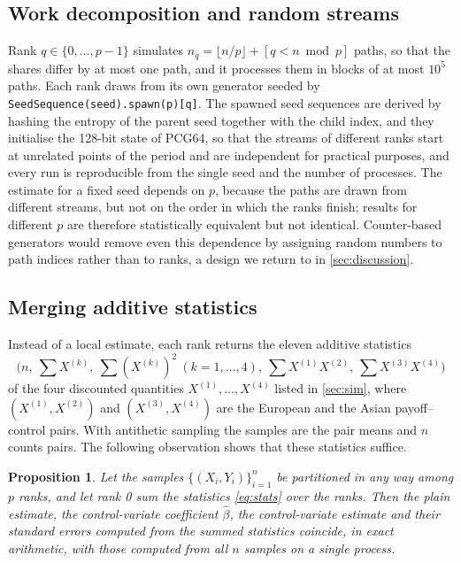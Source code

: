 \documentclass[11pt,a4paper]{article}
\newtheorem{proposition}{Proposition}[section]
\begin{document}
\subsection{Work decomposition and random streams}\label{sec:streams}

Rank $q\in\{0,\dots,p-1\}$ simulates $n_q = \lfloor n/p\rfloor + [q < n \bmod p]$ paths, so that the shares differ by at most one path, and it processes them in blocks of at most $10^5$ paths.
Each rank draws from its own generator seeded by \texttt{SeedSequence(seed).spawn(p)[q]}.
The spawned seed sequences are derived by hashing the entropy of the parent seed together with the child index, and they initialise the 128-bit state of PCG64, so that the streams of different ranks start at unrelated points of the period and are independent for practical purposes, and every run is reproducible from the single seed and the number of processes.
The estimate for a fixed seed depends on $p$, because the paths are drawn from different streams, but not on the order in which the ranks finish; results for different $p$ are therefore statistically equivalent but not identical.
Counter-based generators \citep{salmon2011} would remove even this dependence by assigning random numbers to path indices rather than to ranks, a design we return to in \cref{sec:discussion}.

\subsection{Merging additive statistics}\label{sec:merge}

Instead of a local estimate, each rank returns the eleven additive statistics
\begin{equation}\label{eq:stats}
\Big(n,\ \textstyle\sum X^{(k)},\ \sum (X^{(k)})^2\ (k=1,\dots,4),\ \sum X^{(1)}X^{(2)},\ \sum X^{(3)}X^{(4)}\Big)
\end{equation}
of the four discounted quantities $X^{(1)},\dots,X^{(4)}$ listed in \cref{sec:sim}, where $(X^{(1)},X^{(2)})$ and $(X^{(3)},X^{(4)})$ are the European and the Asian payoff--control pairs.
With antithetic sampling the samples are the pair means and $n$ counts pairs.
The following observation shows that these statistics suffice.

\begin{proposition}\label{prop:merge}
Let the samples $\{(X_i,Y_i)\}_{i=1}^n$ be partitioned in any way among $p$ ranks, and let rank 0 sum the statistics \cref{eq:stats} over the ranks. Then the plain estimate, the control-variate coefficient $\hat\beta$, the control-variate estimate and their standard errors computed from the summed statistics coincide, in exact arithmetic, with those computed from all $n$ samples on a single process.
\end{proposition}
\end{document}
